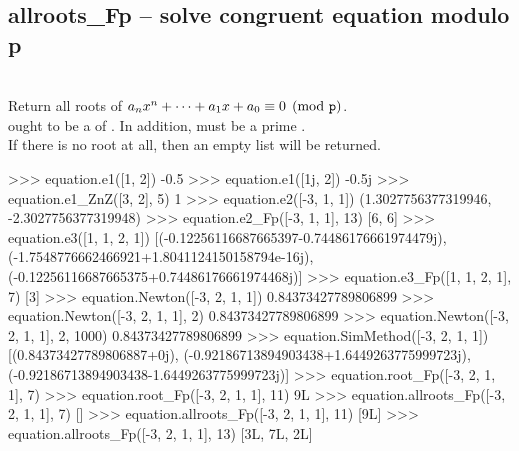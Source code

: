   \subsection{allroots\_Fp -- solve congruent equation modulo p}
   \\
   \spacing
   \quad Return all roots of $a_nx^n + \cdots + a_1x + a_0 \equiv 0 \pmod{{\texttt p}}$. \\
   \spacing
   \quad {} ought to be a  of
   .
   In addition,  must be a prime . \\
   \quad If there is no root at all, then an empty list will be returned.\\
%
\begin{ex}
>>> equation.e1([1, 2])
-0.5
>>> equation.e1([1j, 2])
-0.5j
>>> equation.e1_ZnZ([3, 2], 5)
1
>>> equation.e2([-3, 1, 1])
(1.3027756377319946, -2.3027756377319948)
>>> equation.e2_Fp([-3, 1, 1], 13)
[6, 6]
>>> equation.e3([1, 1, 2, 1])
[(-0.12256116687665397-0.74486176661974479j), 
(-1.7548776662466921+1.8041124150158794e-16j), 
(-0.12256116687665375+0.74486176661974468j)]
>>> equation.e3_Fp([1, 1, 2, 1], 7)
[3]
>>> equation.Newton([-3, 2, 1, 1])
0.84373427789806899
>>> equation.Newton([-3, 2, 1, 1], 2)
0.84373427789806899
>>> equation.Newton([-3, 2, 1, 1], 2, 1000)
0.84373427789806899
>>> equation.SimMethod([-3, 2, 1, 1])
[(0.84373427789806887+0j), 
(-0.92186713894903438+1.6449263775999723j), 
(-0.92186713894903438-1.6449263775999723j)]
>>> equation.root_Fp([-3, 2, 1, 1], 7)
>>> equation.root_Fp([-3, 2, 1, 1], 11)
9L
>>> equation.allroots_Fp([-3, 2, 1, 1], 7)
[]
>>> equation.allroots_Fp([-3, 2, 1, 1], 11)
[9L]
>>> equation.allroots_Fp([-3, 2, 1, 1], 13)
[3L, 7L, 2L]
\end{ex}%
\C



